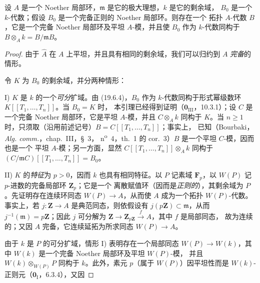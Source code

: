 \begin{lemma}[19.7.1.3]
\label{0.19.7.1.3-fr}
设 $A$ 是一个 Noether 局部环，$\mathfrak m$ 是它的极大理想，$k$ 是它的剩余域，
$B_0$ 是一个 $k$-代数；假设 $B_0$ 是一个完备正则的 Noether 局部环。则存在一个
拓扑 $A$-代数 $B$，它是一个完备 Noether 局部环及平坦 $A$-模，并且使 $B_0$
作为 $k$-代数同构于
$B\otimes_A k=B/\mathfrak mB$。
\end{lemma}

\begin{proof}
由于 $\widehat A$ 在 $A$ 上平坦，并且具有相同的剩余域，我们可以归约到 $A$
\emph{完备}的情形。

令 $K$ 为 $B_0$ 的剩余域，并分两种情形：

\medskip
\noindent I) $K$ 是 $k$ 的一个\emph{可分}扩域。由 (19.6.4)，$B_0$ 作为
$k$-代数同构于形式幂级数环 $K[[T_1,\ldots,T_n]]$。当 $B_0=K$ 时，
本引理已经得到证明（$\mathbf 0_{\mathrm{III}}$，10.3.1）；设 $C$ 是一个完备
Noether 局部环，它是平坦 $A$-模，并且 $C\otimes_A k$ 同构于 $K$。当
$n\geq1$ 时，只须取（沿用前述记号）$B=C[[T_1,\ldots,T_n]]$；事实上，
已知（Bourbaki，\emph{Alg. comm.}，chap.~III，§~3，
n\textsuperscript{o}~4，th.~1 的 cor.~3）$B$ 是一个平坦 $C$-模，因而也是一个
平坦 $A$-模；另一方面，显然 $C[[T_1,\ldots,T_n]]\otimes_A k$ 同构于
$(C/\mathfrak mC)[[T_1,\ldots,T_n]]=B_0$。

\medskip
\noindent II) $K$ 的\emph{特征}为 $p>0$，因而 $k$ 也具有相同特征。以 $P$
记素域 $\mathbf F_p$，以 $W(P)$ 记 $p$-进数的完备局部环 $\mathbf Z_p$；它是一个
离散赋值环（因而是\emph{正则的}），其剩余域为 $P$。先证明存在连续环同态
$W(P)\to A$，从而使 $A$ 成为一个拓扑 $W(P)$-代数。事实上，若
$j:\mathbf Z\to A$ 是典范同态，则依假设有
$j(p\mathbf Z)\subset\mathfrak m$，从而
$j^{-1}(\mathfrak m)=p\mathbf Z$；因此 $j$ 可分解为
$\mathbf Z\to\mathbf Z_{p\mathbf Z}\xrightarrow{f}A$，其中 $f$ 是局部同态，
故为连续的；又因 $A$ 完备，它连续延拓为所求同态 $W(P)\to A$。

由于 $k$ 是 $P$ 的可分扩域，情形 I) 表明存在一个局部同态
$W(P)\to W(k)$，其中 $W(k)$ 是一个完备 Noether 局部环及平坦 $W(P)$-模，
并且 $W(k)\otimes_{W(P)}P$ 同构于 $k$。此外，素元 $p$（属于 $W(P)$）因平坦性而是
$W(k)$-正则元（$\mathbf 0_{\mathrm I}$，6.3.4），又因



\end{proof}
